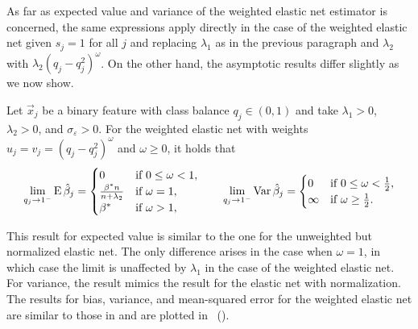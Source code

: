 As far as expected value and variance of the weighted elastic net estimator is concerned,
the same expressions apply directly in the case of the weighted elastic net given \(s_j =
1\) for all \(j\) and replacing \(\lambda_1\) as in the previous paragraph and
\(\lambda_2\) with \(\lambda_2 (q_j - q_j^2)^\omega\). On the other hand, the asymptotic
results differ slightly as we now show.

\begin{theorem}
  \label{thm:weighted-elasticnet-bias-variance}
  Let \(\vec{x}_j\) be a binary feature with class balance \(q_j \in (0, 1)\) and take
  \(\lambda_1 > 0\), \(\lambda_2 > 0\), and \(\sigma_\varepsilon > 0\). For the
  weighted elastic net with weights \(u_j = v_j = (q_j-q_j^2)^\omega\) and \(\omega \geq 0\), it holds that
  \[
    \lim_{q_j \rightarrow 1^-} \operatorname{E} \hat{\beta}_j =
    \begin{cases}
      0                              & \text{if } 0 \leq \omega < 1, \\
      \frac{\beta^*n}{n + \lambda_2} & \text{if } \omega = 1,        \\
      \beta^*                        & \text{if } \omega > 1,
    \end{cases}
    \qquad
    \lim_{q_j \rightarrow 1^-} \operatorname{Var} \hat{\beta}_j =
    \begin{cases}
      0      & \text{if } 0 \leq \omega < \frac{1}{2}, \\
      \infty & \text{if } \omega \geq \frac{1}{2}.
    \end{cases}
  \]
\end{theorem}

This result for expected value is similar to the one for the unweighted but normalized
elastic net. The only difference arises in the case when \(\omega = 1\), in which case the
limit is unaffected by \(\lambda_1\) in the case of the weighted elastic net. For variance,
the result mimics the result for the elastic net with normalization. The results for bias,
variance, and mean-squared error for the weighted elastic net are similar to those in
 and are plotted in
~().

